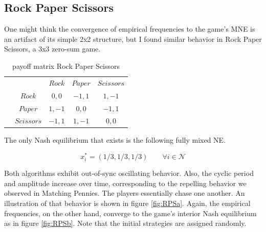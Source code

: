 \subsection{Rock Paper Scissors}\label{subsection:rockPaperScissors}

One might think the convergence of empirical frequencies to the game's MNE is an artifact of its simple 2x2 structure, but I found similar behavior in Rock Paper Scissors, a 3x3 zero-sum game.

\begin{table}[H]\centering
\setlength{\extrarowheight}{2pt}
\begin{tabular}{cc|c|c|c|}
  & \multicolumn{1}{c}{} & \multicolumn{1}{c}{$Rock$}  & \multicolumn{1}{c}{$Paper$}  & \multicolumn{1}{c}{$Scissors$} \\\cline{3-5}
            & $Rock$ & $0,0$ & $-1,1$ & $1,-1$ \\ \cline{3-5}
            & $Paper$ & $1,-1$ & $0,0$ & $-1,1$ \\\cline{3-5}
            & $Scissors$ & $-1,1$ & $1,-1$ & $0,0$ \\\cline{3-5}
\end{tabular}\caption{\label{tab:payoffRPS}payoff matrix Rock Paper Scissors}
\end{table}

The only Nash equilibrium that exists is the following fully mixed NE.

\begin{equation*}
    x_{i}^{*} = (1/3,1/3,1/3) \qquad \forall i \in \mathcal{N}
\end{equation*}

Both algorithms exhibit out-of-sync oscillating behavior. Also, the cyclic period and amplitude increase over time, corresponding to the repelling behavior we observed in Matching Pennies. The players essentially chase one another. An illustration of that behavior is shown in figure \ref{fig:RPSa}. Again, the empirical frequencies, on the other hand, converge to the game's interior Nash equilibrium as in figure \ref{fig:RPSb}. Note that the initial strategies are assigned randomly.

